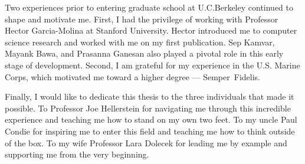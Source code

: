 Two experiences prior to entering graduate school at U.C.\@ Berkeley continued
to shape and motivate me.  First, I had the privilege of working with Professor
Hector Garcia-Molina at Stanford University.  Hector introduced me to computer
science research and worked with me on my first publication.  Sep Kamvar,
Mayank Bawa, and Prasanna Ganesan also played a pivotal role in this early
stage of development.  Second, I am grateful for my experience in the U.S.\@
Marine Corps, which motivated me toward a higher degree --- Semper~Fidelis.

Finally, I would like to dedicate this thesis to the three individuals that
made it possible.  To Professor Joe Hellerstein for navigating me through this
incredible experience and teaching me how to stand on my own two feet.  To my
uncle Paul Condie for inspiring me to enter this field and teaching me how to
think outside of the box.  To my wife Professor Lara Dolecek for leading me by
example and supporting me from the very beginning.


